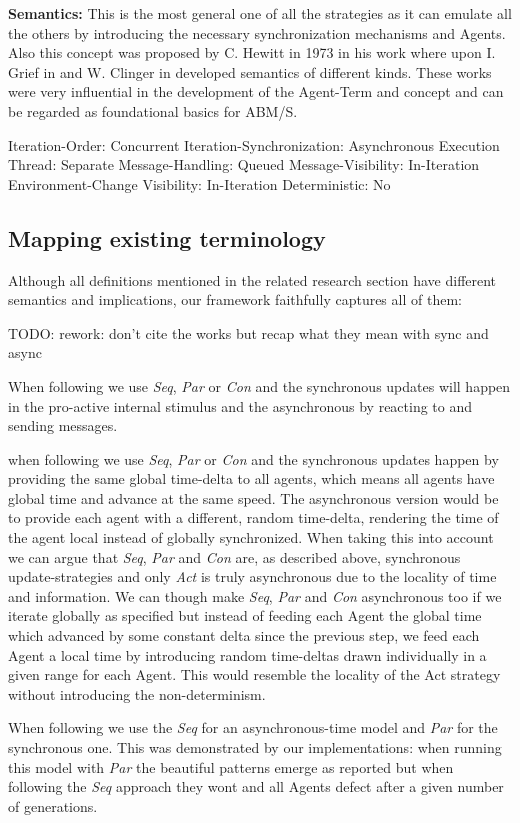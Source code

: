 \textbf{Semantics:} This is the most general one of all the strategies as it can emulate all the others by introducing the necessary synchronization mechanisms and Agents. Also this concept was proposed by C. Hewitt in 1973 in his work \cite{hewitt_universal_1973} where upon I. Grief in \cite{grief_semantics_1975} and W. Clinger in \cite{clinger_foundations_1981} developed semantics of different kinds. These works were very influential in the development of the Agent-Term and concept and can be regarded as foundational basics for ABM/S.

	Iteration-Order:			Concurrent
	Iteration-Synchronization: 	Asynchronous
	Execution Thread:			Separate
 	Message-Handling:			Queued
 	Message-Visibility:			In-Iteration
 	Environment-Change Visibility:		In-Iteration
 	Deterministic:				No
 	
\subsection{Mapping existing terminology}
Although all definitions mentioned in the related research section have different semantics and implications, our framework faithfully captures all of them:

TODO: rework: don't cite the works but recap what they mean with sync and async

When following \cite{yuxuan_agent-based_2016} we use \textit{Seq}, \textit{Par} or \textit{Con} and the synchronous updates will happen in the pro-active internal stimulus and the asynchronous by reacting to and sending messages.

when following \cite{dawson_opening_2014} we use \textit{Seq}, \textit{Par} or \textit{Con} and the synchronous updates happen by providing the same global time-delta to all agents, which means all agents have global time and advance at the same speed. The asynchronous version would be to provide each agent with a different, random time-delta, rendering the time of the agent local instead of globally synchronized. When taking this into account we can argue that \textit{Seq}, \textit{Par} and \textit{Con} are, as described above, synchronous update-strategies and only \textit{Act} is truly asynchronous due to the locality of time and information. We can though make \textit{Seq}, \textit{Par} and \textit{Con} asynchronous too if we iterate globally as specified but instead of feeding each Agent the global time which advanced by some constant delta since the previous step, we feed each Agent a local time by introducing random time-deltas drawn individually in a given range for each Agent. This would resemble the locality of the Act strategy without introducing the non-determinism.

When following \cite{huberman_evolutionary_1993} we use the \textit{Seq} for an asynchronous-time model and \textit{Par} for the synchronous one. This was demonstrated by our implementations: when running this model with \textit{Par} the beautiful patterns emerge as reported but when following the \textit{Seq} approach they wont and all Agents defect after a given number of generations.


